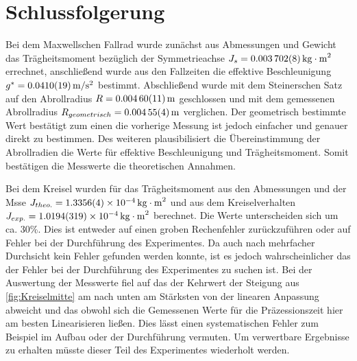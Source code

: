 \FloatBarrier
\section{Schlussfolgerung}

Bei dem Maxwellschen Fallrad wurde zunächst aus Abmessungen und Gewicht das Trägheitsmoment bezüglich der Symmetrieachse $J_s=\SI{0.003702 \pm 0.000008}{kg\cdot m^2}$ errechnet, anschließend wurde aus den Fallzeiten die effektive Beschleunigung  $g^*=\SI{0.0410 \pm  0.0019}{m \per s \squared}$ bestimmt. Abschließend wurde mit dem Steinerschen Satz auf den Abrollradius $R=\SI{0.00460\pm 0.00011}{m}$ geschlossen und mit dem gemessenen Abrollradius $R_{geometrisch}=\SI{0.00455 \pm 0.00004}{m}$ verglichen. Der geometrisch bestimmte Wert bestätigt zum einen die vorherige Messung ist jedoch einfacher und genauer direkt zu bestimmen. Des weiteren plausibilisiert die Übereinstimmung der Abrollradien die Werte für effektive Beschleunigung und Trägheitsmoment. Somit bestätigen die Messwerte die theoretischen Annahmen.

Bei dem Kreisel wurden für das Trägheitsmoment aus den Abmessungen und der Msse  $J_{theo.}=\SI{1,3356+-0,0004e-4}{kg \cdot m^2}$ und aus dem Kreiselverhalten $J_{exp.}=\SI{1,0194+-0,0319e-4}{kg \cdot m^2}$ berechnet. Die Werte unterscheiden sich um ca. 30\%.
Dies ist entweder auf einen groben Rechenfehler zurückzuführen oder auf Fehler bei der Durchführung des Experimentes. Da auch nach mehrfacher Durchsicht kein Fehler gefunden werden konnte, ist es jedoch wahrscheinlicher das der Fehler bei der Durchführung des Experimentes zu suchen ist. Bei der Auswertung der Messwerte fiel auf das der Kehrwert der Steigung aus \cref{fig:Kreiselmitte} am nach unten am Stärksten von der linearen Anpassung abweicht und das obwohl sich die Gemessenen Werte für die Präzessionszeit hier am besten Linearisieren ließen. Dies lässt einen systematischen Fehler zum Beispiel im Aufbau oder der Durchführung %
vermuten. Um verwertbare Ergebnisse zu erhalten müsste dieser Teil des Experimentes wiederholt werden.







